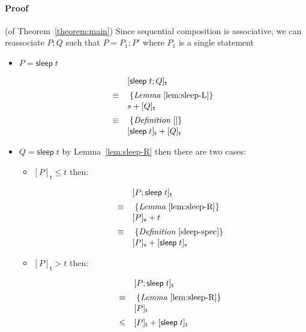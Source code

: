 \documentclass[preprint]{sigplanconf}
\renewcommand{\leq}{\leqslant}
\theoremstyle{definition}
\newcommand{\sleep}{\mathsf{sleep}\;}
\newcommand{\vtime}[1]{[#1]_{\mathsf{v}}}
\newcommand{\etime}[1]{[#1]_{\mathsf{t}}}
\begin{document}


\appendix

\paragraph{Proof} (of Theorem~\ref{theorem:main})
Since sequential composition is associative, we can reassociate
$P; Q$ such that $P = P_1; P'$ where $P_1$ is a single statement

\begin{itemize}
\item $P = \sleep t$

\begin{align*}
\begin{array}{ll}
       & \etime{\sleep t; Q} \\[0.5em]
\equiv & \; \{\textit{Lemma}~\ref{lem:sleep-L}\} \\[0.1em]
       & s + \etime{Q} \\[0.5em]
\equiv & \; \{\textit{Definition}~\ref{}\} \\[0.1em]
       & \etime{\sleep t} + \etime{Q}
\end{array}
\end{align*}

\item $Q = \sleep t$ by Lemma~\ref{lem:sleep-R} then 
there are two cases:

\begin{itemize}
\item $\etime{P} \leq t$ then:

\begin{align*}
\begin{array}{ll}
       & \etime{P; \sleep t} \\[0.5em]
\equiv & \; \{\textit{Lemma}~\ref{lem:sleep-R}\} \\[0.1em]
       & \vtime{P} + t \\[0.5em]
\equiv & \; \{\textit{Definition}~\ref{sleep-spec}\} \\[0.1em]
       & \vtime{P} + \vtime{\sleep t}
\end{array}
\end{align*}

\item $\etime{P} > t$ then:

\begin{align*}
\begin{array}{ll}
       & \etime{P; \sleep t} \\[0.5em]
\equiv & \; \{\textit{Lemma}~\ref{lem:sleep-R}\} \\[0.1em]
       & \etime{P} \\[0.5em]
\leq   & \etime{P} + \etime{\sleep t}
\end{array}
\end{align*}


\end{itemize}
\end{itemize}
\end{document}
